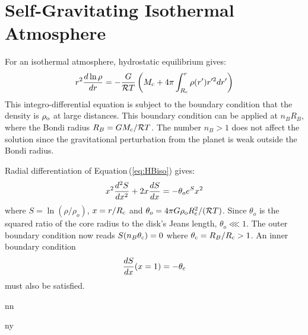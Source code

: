 \documentclass[12pt, preprint,numberedappendix]{emulateapj}
\newcommand\submitms{n}		%
\newcommand\bibinc{n}		%
\newcommand{\Eq}[1]{Equation\,(\ref{#1})}
\newcommand{\co}{_{\rm c}}
\newcommand{\di}{_{\rm o}}
\begin{document}

\acknowledgements
\appendix
\section{Self-Gravitating Isothermal Atmosphere}

For an isothermal atmosphere, hydrostatic equilibrium gives:
\begin{equation} \label{eq:HBiso}
r^2 {d \ln \rho \over d r} = -{G \over \mathcal{R} T} \left(M\co + 4 \pi \int_{R\co}^r \rho(r') r'^2 dr'\right) 
\end{equation} 
This integro-differential equation is subject to the boundary condition that the density is $\rho\di$ at large distances.  This boundary condition can be applied at $n_B R_B$, where the Bondi radius $R_B = GM\co/\mathcal{R} T$.  The number $n_B > 1$ does not affect the solution since the gravitational perturbation from the planet is weak outside the Bondi radius.

Radial differentiation of \Eq{eq:HBiso} gives:
\begin{equation} 
x^2 {d^2 S \over dx^2} + 2x {d S \over dx} = - \theta_o e^S x^2
\end{equation} 
where $S = \ln(\rho/\rho_o)$, $x = r/R\co$ and $\theta_o = 4 \pi G \rho\di R\co^2 /(\mathcal{R} T)$.  Since $\theta_o$ is the squared ratio of the core radius to the disk's Jeans length, $\theta_o \lll 1$. The outer boundary condition now reads $S(n_B \theta\co) = 0$ where $\theta\co = R_B/R\co > 1$.  An inner boundary condition
\begin{equation} 
{d S \over dx}(x = 1) = - \theta\co
\end{equation} 
must also be satisfied.


\if\bibinc n

\fi

\if\bibinc y
\begin{thebibliography}
\end{thebibliography}
\fi
\end{document}
